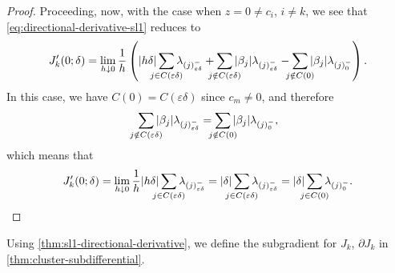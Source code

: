 \begin{proof}
  Proceeding, now, with the case when \(z = 0 \neq c_i\), \(i \neq k\),
  we see that \eqref{eq:directional-derivative-sl1} reduces to
  \begin{equation*}
    J_k'(0; \delta) = \lim_{h \downarrow 0}
    \frac{1}{h}
    \left(
      |h \delta| \smashoperator{\sum_{j \in C(\varepsilon\delta)}} \lambda_{(j)^-_{\varepsilon\delta}}
      + \smashoperator{\sum_{j \notin C(\varepsilon\delta)}} |\beta_j| \lambda_{(j)^-_{\varepsilon\delta}}
      - \smashoperator{\sum_{j \notin C(0)}} |\beta_j| \lambda_{(j)^-_{0}}
    \right).
  \end{equation*}
  In this case, we have \(C(0) = C(\varepsilon\delta)\) since \(c_m \neq 0\), and therefore
  \[
    \smashoperator{\sum_{j \notin C(\varepsilon\delta)}} |\beta_j| \lambda_{(j)^-_{\varepsilon\delta}}
    = \smashoperator{\sum_{j \notin C(0)}} |\beta_j| \lambda_{(j)^-_{0}},
  \]
  which means that
  \begin{equation*}
    J_k'(0; \delta) = \lim_{h \downarrow 0}
    \frac{1}{h}
    |h \delta| \smashoperator{\sum_{j \in C(\varepsilon\delta)}} \lambda_{(j)^-_{\varepsilon\delta}}
    = |\delta|\smashoperator{\sum_{j \in C(\varepsilon\delta)}} \lambda_{(j)^-_{\varepsilon\delta}}
    = |\delta|\smashoperator{\sum_{j \in C(0)}} \lambda_{(j)^-_{0}}.
  \end{equation*}
\end{proof}

Using \cref{thm:sl1-directional-derivative}, we define the subgradient for
\(J_k\), \(\partial J_k\) in \cref{thm:cluster-subdifferential}.

